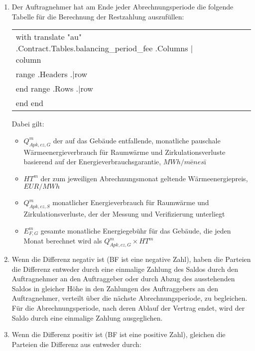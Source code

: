 \begin{enumerate}
\begin{enumerate}
\item Der Auftragnehmer hat am Ende jeder Abrechnungsperiode die folgende Tabelle für die Berechnung der Restzahlung auszufüllen:


\begin{center}
\begin{tabu}{|X|X|X|X|X|X|X|} \tabucline{}
{{with translate "au" .Contract.Tables.balancing_period_fee}} %
	{{.Columns | column}} \\\tabucline{}
	{{range .Headers}} {{.|row}} \\\tabucline{} {{end}} %
	{{range .Rows}} {{.|row}} \\\tabucline{} {{end}} %
{{end}}
\end{tabu}
\end{center}

Dabei gilt:

\begin{itemize}
	\item $Q^{m}_{Apk,cz,G}$ \quad der auf das Gebäude entfallende, monatliche pauschale Wärmeenergieverbrauch für Raumwärme und Zirkulationsverluste basierend auf der Energieverbrauchsgarantie, $MWh/mēnesī$
	\item $HT^m$ \quad \quad der zum jeweiligen Abrechnungsmonat geltende Wärmeenergiepreis, $EUR/MWh$
	\item $Q^m_{Apk,cz,S}$ \quad monatlicher Energieverbrauch für Raumwärme und Zirkulationsverluste, der der Messung und Verifizierung unterliegt 
	\item $E^m_{F,G}$ \quad \quad gesamte monatliche Energiegebühr für das Gebäude, die jeden Monat berechnet wird als $Q^{m}_{Apk,cz,G} \times HT^{m}$
\end{itemize}

\item Wenn die Differenz negativ ist (BF ist eine negative Zahl), haben die Parteien die Differenz entweder durch eine einmalige Zahlung des Saldos durch den Auftragnehmer an den Auftraggeber oder durch Abzug des ausstehenden Saldos in gleicher Höhe in den Zahlungen des Auftraggebers an den Auftragnehmer, verteilt über die nächste Abrechnungsperiode, zu begleichen. Für die Abrechnungsperiode, nach deren Ablauf der Vertrag endet, wird der Saldo durch eine einmalige Zahlung ausgeglichen.
\item Wenn die Differenz positiv ist (BF ist eine positive Zahl), gleichen die Parteien die Differenz aus entweder durch:


\end{enumerate}
\end{enumerate}

